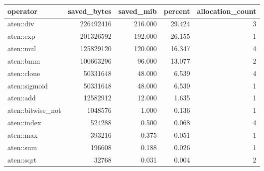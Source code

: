 \begin{tabular}{lrrrr}
\toprule
operator & saved\_bytes & saved\_mib & percent & allocation\_count \\
\midrule
aten::div & 226492416 & 216.000 & 29.424 & 3 \\
aten::exp & 201326592 & 192.000 & 26.155 & 1 \\
aten::mul & 125829120 & 120.000 & 16.347 & 4 \\
aten::bmm & 100663296 & 96.000 & 13.077 & 2 \\
aten::clone & 50331648 & 48.000 & 6.539 & 4 \\
aten::sigmoid & 50331648 & 48.000 & 6.539 & 1 \\
aten::add & 12582912 & 12.000 & 1.635 & 1 \\
aten::bitwise\_not & 1048576 & 1.000 & 0.136 & 1 \\
aten::index & 524288 & 0.500 & 0.068 & 4 \\
aten::max & 393216 & 0.375 & 0.051 & 1 \\
aten::sum & 196608 & 0.188 & 0.026 & 1 \\
aten::sqrt & 32768 & 0.031 & 0.004 & 2 \\
\bottomrule
\end{tabular}
